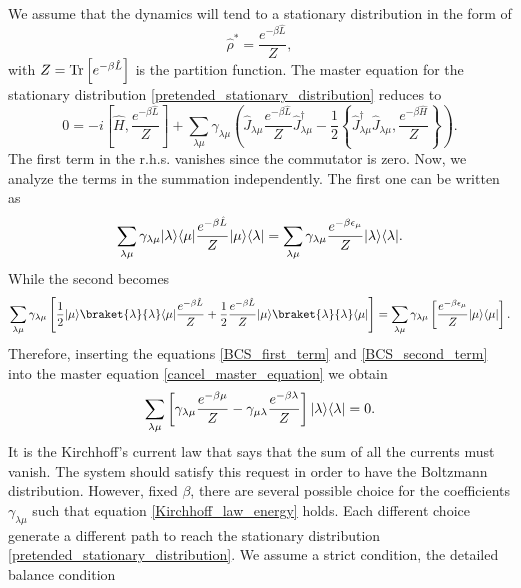 We assume that the dynamics will tend to a stationary distribution in the form of
\begin{equation}\label{pretended_stationary_distribution}
    \hat \rho^* = \frac{e^{-\beta\hat L}}{Z},
\end{equation}
with $Z = \operatorname{Tr}\left[e^{-\beta\hat L}\right]$ is the partition function.
The master equation for the stationary distribution \eqref{pretended_stationary_distribution} reduces to
\begin{equation}\label{cancel_master_equation}
    0 = -i\left[\hat H, \frac{e^{-\beta\hat L}}{Z}\right] + \sum_{\lambda\mu} \gamma_{\lambda\mu} \left(\hat J_{\lambda\mu}  \frac{e^{-\beta\hat L}}{Z} \hat J^\dagger_{\lambda\mu} - \frac{1}{2}\left\{ \hat J^\dagger_{\lambda\mu}\hat J_{\lambda\mu},  \frac{e^{-\beta\hat H}}{Z}\right\} \right).
\end{equation}
The first term in the r.h.s. vanishes since the commutator is zero.
Now, we analyze the terms in the summation independently.
The first one can be written as 
\begin{equation}\label{BCS_first_term}
        \sum_{\lambda\mu} \gamma_{\lambda\mu} \lvert\lambda\rangle\langle\mu\rvert\frac{e^{-\beta\hat L}}{Z} \lvert\mu\rangle\langle\lambda\rvert = 
        \sum_{\lambda\mu} \gamma_{\lambda\mu} \frac{e^{-\beta \epsilon_\mu}}{Z} \lvert\lambda\rangle\langle\lambda\rvert.
\end{equation}
While the second becomes
\begin{equation}\label{BCS_second_term}
    \sum_{\lambda\mu} \gamma_{\lambda\mu}\left[\frac{1}{2}\ket{\mu}\braket{\lambda}{\lambda}\bra{\mu}\frac{e^{-\beta\hat L}}{Z} +\frac{1}{2}\frac{e^{-\beta\hat L}}{Z}\ket{\mu}\braket{\lambda}{\lambda}\bra{\mu}\right]= \sum_{\lambda\mu} \gamma_{\lambda\mu}\left[\frac{e^{-\beta \epsilon_\mu}}{Z}\ket{\mu}\bra{\mu}\right].
\end{equation}
Therefore, inserting the equations \eqref{BCS_first_term} and \eqref{BCS_second_term} into the master equation \eqref{cancel_master_equation} we obtain 
\begin{equation}\label{Kirchhoff_law_energy}
    \sum_{\lambda\mu}\left[\gamma_{\lambda\mu}\frac{e^{-\beta \mu}}{Z} - \gamma_{\mu\lambda}\frac{e^{-\beta \lambda}}{Z}\right]\lvert\lambda\rangle\langle\lambda\rvert = 0.
\end{equation}
It is the Kirchhoff's current law that says that the sum of all the currents must vanish. The system should satisfy this request in order to have the Boltzmann distribution.
However, fixed $\beta$, there are several possible choice for the coefficients $\gamma_{\lambda\mu}$ such that equation \eqref{Kirchhoff_law_energy} holds.
Each different choice generate a different path to reach the stationary distribution \eqref{pretended_stationary_distribution}.
We assume a strict condition, the detailed balance condition


